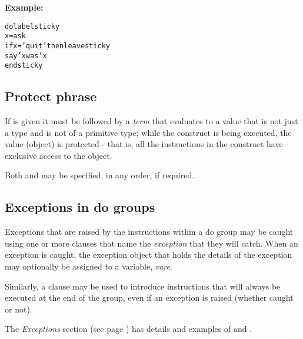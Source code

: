 \textbf{Example:}
\begin{alltt}
do label sticky
  x=ask
  if x='quit' then leave sticky
  say 'x was' x
  end sticky
\end{alltt}
\subsection{Protect phrase}
 
If  is given it must be followed by a \emph{term}
that evaluates to a value that is not just a type and is not of a
primitive type; while the  construct is being executed, the
value (object) is protected - that is, all the instructions in the
 construct have exclusive access to the object.
 
Both  and  may be specified, in any order,
if required.
\subsection{Exceptions in do groups}
 
Exceptions that are raised by the instructions within a do group may be
caught using one or more  clauses that name the
\emph{exception} that they will catch.
When an exception is caught, the exception object that holds the details
of the exception may optionally be assigned to a variable,
\emph{vare}.
 
Similarly, a  clause may be used to introduce
instructions that will always be executed at the end of the group, even
if an exception is raised (whether caught or not).
 
The  \emph{Exceptions} section (see page \pageref{refexcep})  has details and
examples of  and .
\index{,}

